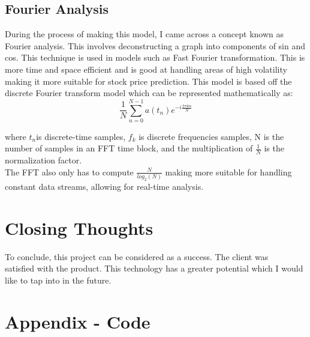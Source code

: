 \documentclass{article}
\begin{document}
\subsection{Fourier Analysis}
During the process of making this model, I came across a concept known as Fourier
analysis. This involves deconstructing a graph into components of sin and cos.
This technique is used in models such as Fast Fourier transformation. This is more
time and space efficient and is good at handling areas of high volatility making
it more suitable for stock price prediction.
This model is based off the discrete Fourier transform model which can be
represented mathematically as:
$$\frac{1}{N}\sum_{n=0}^{N-1}a(t_n)e^{-i\frac{2\pi kn}{N}}$$

where $t_n$is discrete-time samples, $f_k$ is discrete frequencies samples,
N is the number of samples in an FFT time block, and the multiplication of
$\frac{1}{N}$  is the normalization factor.\\
The FFT also only has to compute $\frac{N}{log_2(N)}$ making more suitable for
handling constant data streams, allowing for real-time analysis.

\section{Closing Thoughts}
To conclude, this project can be considered as a success. The client was\\ satisfied
with the product. This technology has a greater potential which I would like to
tap into in the future.

\clearpage

\section{Appendix - Code}
\end{document}
